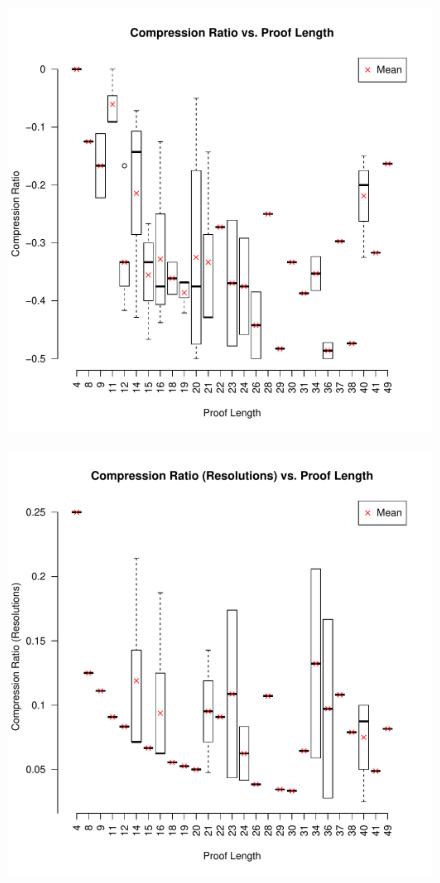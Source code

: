 \begin{figure}
\includegraphics[scale=0.5]{images/compress_ratio_vs_proof_length.pdf}
\end{figure}

\begin{figure}
\includegraphics[scale=0.5]{images/compress_ratio_res_vs_proof_length.pdf}
\end{figure}

